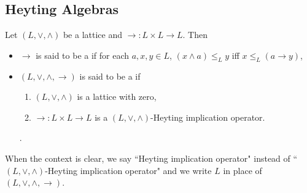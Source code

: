 \documentclass{book}
\begin{document}
	
	
	
	
	
	
	
	
	
	
	
	
	
	
	
	
	
	
	
	
	
	
	
	
	
	
	
	
	
	
	
	
	
	
	
	
	
	
	
	
	
	
	
	
	
	
	
	\subsection{Heyting Algebras}
	
	\begin{defn}
		Let $(L, \vee, \wedge)$ be a lattice and $\rightarrow: L \times L \rightarrow L$. Then 
		\begin{itemize}
			\item $\rightarrow$ is said to be a  if for each $a, x, y \in L$, $(x \wedge a) \leq_L y$ iff $x \leq_L (a \rightarrow y)$,
			\item $(L, \vee, \wedge, \rightarrow)$ is said to be a  if 
			\begin{enumerate}
				\item $(L, \vee, \wedge)$ is a lattice with zero,
				\item $\rightarrow: L \times L \rightarrow L$ is a $(L, \vee, \wedge)$-Heyting implication operator.
			\end{enumerate}. 
		\end{itemize}
	\end{defn}
	
	\begin{note}
		When the context is clear, we say ``Heyting implication operator" instead of ``$(L, \vee, \wedge)$-Heyting implication operator" and we write $L$ in place of $(L, \vee, \wedge, \rightarrow)$.
	\end{note}
	
\end{document}

